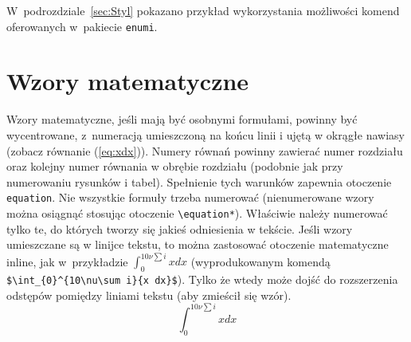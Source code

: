 W~podrozdziale~\ref{sec:Styl} pokazano przykład wykorzystania możliwości komend oferowanych w~pakiecie \texttt{enumi}.

\section{Wzory matematyczne}
Wzory matematyczne, jeśli mają być osobnymi formułami, powinny być wycentrowane, z~numeracją umieszczoną na końcu linii i ujętą w okrągłe nawiasy (zobacz równanie (\ref{eq:xdx})). Numery równań powinny zawierać numer rozdziału oraz kolejny numer równania w obrębie rozdziału (podobnie jak przy numerowaniu rysunków i tabel). Spełnienie tych warunków zapewnia otoczenie \verb?equation?. Nie wszystkie formuły trzeba numerować (nienumerowane wzory można osiągnąć stosując otoczenie \verb?\equation*?). Właściwie należy numerować tylko te, do których tworzy się jakieś odniesienia w tekście. Jeśli wzory umieszczane są w linijce tekstu, to można zastosować otoczenie matematyczne inline, jak w~przykładzie $\int_{0}^{10\nu\sum i}{x dx}$ (wyprodukowanym komendą \verb?$\int_{0}^{10\nu\sum i}{x dx}$?). Tylko że wtedy może dojść do rozszerzenia odstępów pomiędzy liniami tekstu (aby zmieścił się wzór).
\begin{equation}\label{eq:xdx}
	\int_{0}^{10\nu\sum i}{x dx}
\end{equation}
